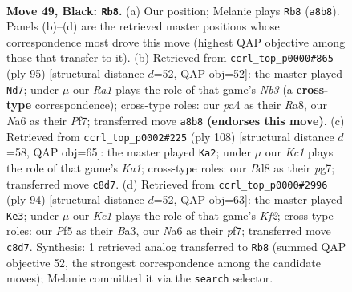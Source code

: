 \documentclass[11pt]{article}
\begin{document}
\clearpage

\begin{figure}[p]\centering
\begin{subfigure}{0.46\textwidth}\centering
\resizebox{\linewidth}{!}{%
\newchessgame
\chessboard[
  setfen={r1kb4/1p5p/n5pP/p4p2/P2BrN2/3R2P1/7K/6R1 b - - 6 49},
  showmover=false,
  pgfstyle=straightmove, color=movearrow, markmove={a8-b8}
]}
\caption{}
\end{subfigure}\hfill
\begin{subfigure}{0.46\textwidth}\centering
\resizebox{\linewidth}{!}{%
\newchessgame
\chessboard[
  setfen={r3b3/4kp2/1np1p3/1rN3p1/3P2P1/1B3P2/P4K2/2R4R b - - 10 48},
  showmover=false,
  pgfstyle=straightmove, color=movearrow, markmove={b6-d7}
]}
\caption{}
\end{subfigure}
\\[4pt]
\begin{subfigure}{0.46\textwidth}\centering
\resizebox{\linewidth}{!}{%
\newchessgame
\chessboard[
  setfen={8/5rp1/1k5p/p3n2P/4RbP1/1P3P2/2P5/K4R2 w - - 5 55},
  showmover=false,
  pgfstyle=straightmove, color=movearrow, markmove={a1-a2}
]}
\caption{}
\end{subfigure}\hfill
\begin{subfigure}{0.46\textwidth}\centering
\resizebox{\linewidth}{!}{%
\newchessgame
\chessboard[
  setfen={3rk3/1p3pp1/pPn5/P1Rb4/3P4/B5P1/4BK2/8 w - - 15 48},
  showmover=false,
  pgfstyle=straightmove, color=movearrow, markmove={f2-e3}
]}
\caption{}
\end{subfigure}
\caption{\textbf{Move 49, Black: \texttt{Rb8}.} (a) Our position; Melanie plays \texttt{Rb8} (\texttt{a8b8}). Panels (b)--(d) are the retrieved master positions whose correspondence most drove this move (highest QAP objective among those that transfer to it). (b) Retrieved from \texttt{ccrl\_top\_p0000\#865} (ply 95) [structural distance $d$=52, QAP obj=52]: the master played \texttt{Nd7}; under $\mu$ our \emph{Ra1} plays the role of that game's \emph{Nb3} (a \textbf{cross-type} correspondence); cross-type roles: our \emph{p}a4 as their \emph{R}a8, our \emph{N}a6 as their \emph{P}f7; transferred move \texttt{a8b8} \textbf{(endorses this move)}. (c) Retrieved from \texttt{ccrl\_top\_p0002\#225} (ply 108) [structural distance $d$=58, QAP obj=65]: the master played \texttt{Ka2}; under $\mu$ our \emph{Kc1} plays the role of that game's \emph{Ka1}; cross-type roles: our \emph{B}d8 as their \emph{p}g7; transferred move \texttt{c8d7}. (d) Retrieved from \texttt{ccrl\_top\_p0000\#2996} (ply 94) [structural distance $d$=52, QAP obj=63]: the master played \texttt{Ke3}; under $\mu$ our \emph{Kc1} plays the role of that game's \emph{Kf2}; cross-type roles: our \emph{P}f5 as their \emph{B}a3, our \emph{N}a6 as their \emph{p}f7; transferred move \texttt{c8d7}. Synthesis: 1 retrieved analog transferred to \texttt{Rb8} (summed QAP objective 52, the strongest correspondence among the candidate moves); Melanie committed it via the \texttt{search} selector.}
\label{fig:thought-m97}
\end{figure}
\end{document}
